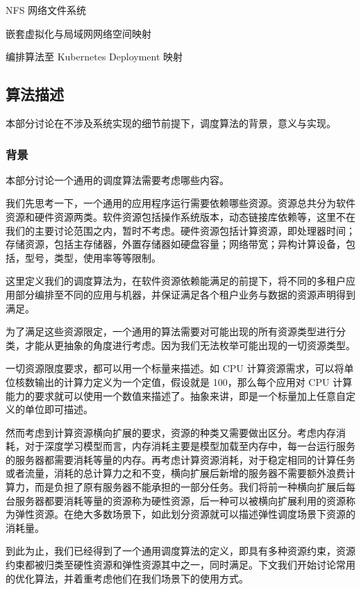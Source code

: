 NFS 网络文件系统

嵌套虚拟化与局域网网络空间映射

编排算法至 Kubernetes Deployment 映射

\subsection{算法描述}

本部分讨论在不涉及系统实现的细节前提下，调度算法的背景，意义与实现。

\subsubsection{背景}

本部分讨论一个通用的调度算法需要考虑哪些内容。

我们先思考一下，一个通用的应用程序运行需要依赖哪些资源。资源总共分为软件资源和硬件资源两类。软件资源包括操作系统版本，动态链接库依赖等，这里不在我们的主要讨论范围之内，暂时不考虑。硬件资源包括计算资源，即处理器时间；存储资源，包括主存储器，外置存储器如硬盘容量；网络带宽；异构计算设备，包括，型号，类型，使用率等等限制。

这里定义我们的调度算法为，在软件资源依赖能满足的前提下，将不同的多租户应用部分编排至不同的应用与机器，并保证满足各个租户业务与数据的资源声明得到满足。

为了满足这些资源限定，一个通用的算法需要对可能出现的所有资源类型进行分类，才能从更抽象的角度进行考虑。因为我们无法枚举可能出现的一切资源类型。

一切资源限度要求，都可以用一个标量来描述。如 CPU 计算资源需求，可以将单位核数输出的计算力定义为一个定值，假设就是 100，那么每个应用对 CPU 计算能力的要求就可以使用一个数值来描述了。抽象来讲，即是一个标量加上任意自定义的单位即可描述。

然而考虑到计算资源横向扩展的要求，资源的种类又需要做出区分。考虑内存消耗，对于深度学习模型而言，内存消耗主要是模型加载至内存中，每一台运行服务的服务器都需要消耗等量的内存。再考虑计算资源消耗，对于稳定相同的计算任务或者流量，消耗的总计算力之和不变，横向扩展后新增的服务器不需要额外浪费计算力，而是负担了原有服务器不能承担的一部分任务。我们将前一种横向扩展后每台服务器都要消耗等量的资源称为硬性资源，后一种可以被横向扩展利用的资源称为弹性资源。在绝大多数场景下，如此划分资源就可以描述弹性调度场景下资源的消耗量。

到此为止，我们已经得到了一个通用调度算法的定义，即具有多种资源约束，资源约束都被归类至硬性资源和弹性资源其中之一，同时满足。下文我们开始讨论常用的优化算法，并着重考虑他们在我们场景下的使用方式。

